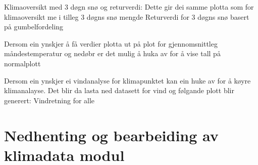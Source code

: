 \documentclass[letterpaper,10pt,norsk]{sphinxmanual}
\begin{document}
\sphinxAtStartPar
Klimaoversikt med 3 døgn snø og returverdi:
Dette gir dei samme plotta som for klimaoversikt me i tilleg
\sphinxhyphen{} 3 døgns snø mengde
\sphinxhyphen{} Returverdi for 3 døgns snø basert på gumbelfordeling

\sphinxAtStartPar
Dersom ein ynskjer å få verdier plotta ut på plot for gjennomsnittleg måndestemperatur og nedøbr er det mulig å huka av for å vise tall på normalplott

\sphinxAtStartPar
Dersom ein ynskjer ei vindanalyse for klimapunktet kan ein huke av for å køyre klimanalayse. Det blir da lasta ned datasett for vind og følgande plott blir generert:
\sphinxhyphen{} Vindretning for alle


\chapter{Nedhenting og bearbeiding av klimadata modul}
\label{\detokenize{index:module-klimadata.klimadata}}\label{\detokenize{index:nedhenting-og-bearbeiding-av-klimadata-modul}}
\end{document}
